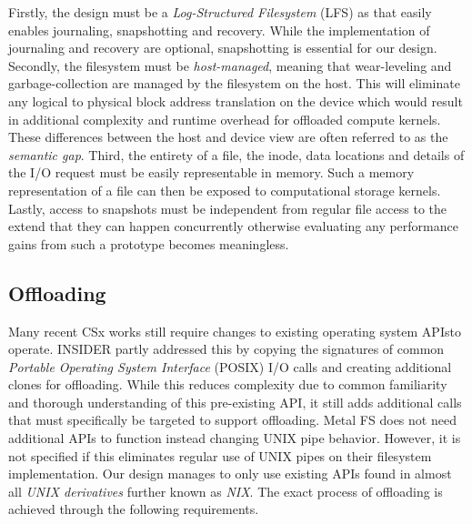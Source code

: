 Firstly, the design must be a \textit{Log-Structured Filesystem} (LFS) as that
easily enables journaling, snapshotting and recovery. While the implementation
of journaling and recovery are optional, snapshotting is essential for our
design. Secondly, the filesystem must be \textit{host-managed}, meaning that
wear-leveling and garbage-collection are managed by the filesystem on the host.
This will eliminate any logical to physical block address translation on the
device which would result in additional complexity and runtime overhead for
offloaded compute kernels. These differences between the host and device view
are often referred to as the \textit{semantic gap}. Third, the entirety of a
file, the inode, data locations and details of the I/O request must be easily
representable in memory. Such a memory representation of a file can then be
exposed to computational storage kernels. Lastly, access to snapshots must be
independent from regular file access to the extend that they can happen
concurrently otherwise evaluating any performance gains from such a prototype
becomes meaningless.

\subsection{Offloading}

Many recent CSx works still require changes to existing operating system
APIs\footnotemark[9] to operate. INSIDER \cite{234968} partly addressed this by
copying the signatures of common \textit{Portable Operating System Interface}
(POSIX) I/O calls and creating additional clones for offloading. While this
reduces complexity due to common familiarity and thorough understanding of
this pre-existing API, it still adds additional calls that must specifically be
targeted to support offloading. Metal FS \cite{10.1145/3415580} does not need
additional APIs to function instead changing UNIX pipe behavior. However, it is
not specified if this eliminates regular use of UNIX pipes on their filesystem
implementation. Our design manages to only use existing APIs found in almost all
\textit{UNIX derivatives} further known as \textit{NIX}. The exact process of
offloading is achieved through the following requirements.


